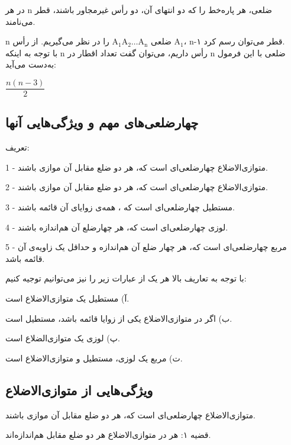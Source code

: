 \documentclass[12pt, a4paper]{book}
\begin{document}
در هر
n
ضلعی، هر پاره‌خط را که دو انتهای آن، دو رأس غیرمجاور باشند، قطر می‌نامند.

n
ضلعی 
$\mbox{A}_{\mbox{1}}\mbox{A}_{\mbox{2}}\dots\mbox{A}_{\mbox{n}}$
 را در نظر می‌گیریم. از رأس 
$\mbox{A}_{\mbox{1}}$،
n-۱
قطر می‌توان رسم کرد.\\
با توجه به اینکه n رأس داریم، می‌توان گفت تعداد اقطار در n ضلعی با این فرمول به‌دست می‌آید:
\begin{minipage}{2 cm}
	\centering
	$\dfrac{n(n-3)}{2}$
\end{minipage}
\newline


\subsection{چهارضلعی‌های مهم و ویژگی‌هایی  آنها}
{\semibold تعریف:}


	1 -
	متوازی‌الاضلاع چهارضلعی‌ای است که، هر دو ضلع مقابل آن موازی باشند.
	
	2 -
متوازی‌الاضلاع چهارضلعی‌ای است که، هر دو ضلع مقابل آن موازی باشند.

	3 -
	مستطیل چهارضلعی‌ای است که ، همه‌ی زوایای آن قائمه باشند.
	
	4 -
	لوزی چهارضلعی‌ای است که، هر چهارضلع آن هم‌اندازه باشند.
	
	5 -
	مربع چهارضلعی‌ای است که، هر چهار ضلع آن هم‌اندازه و حداقل یک زاویه‌ی آن قائمه باشد.

با توجه به تعاریف بالا هر یک از عبارات زیر را نیز می‌توانیم توجیه کنیم: 

{\medium آ)} مستطیل یک متوازی‌الاضلاع است.

{\medium ب)} اگر در متوازی‌الاضلاع یکی از زوایا قائمه باشد، مستطیل است.

{\medium پ)} لوزی یک متوازی‌الضلاع است.

{\medium ت)} مربع یک لوزی، مستطیل و متوازی‌الاضلاع است.

\subsection{ویژگی‌هایی از متوازی‌الاضلاع}
متوازی‌الاضلاع چهارضلعی‌ای است که، هر دو ضلع مقابل آن موازی باشند.

{\semibold قضیه ۱}: هر در متوازی‌الاضلاع هر دو ضلع مقابل هم‌اندازه‌اند.
\end{document}
